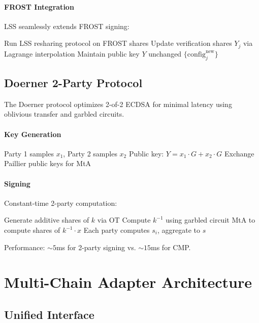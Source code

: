 \documentclass[11pt,twocolumn]{article}
\begin{document}
\paragraph{FROST Integration} LSS seamlessly extends FROST signing:
\begin{algorithmic}[1]
\State Run LSS resharing protocol on FROST shares
\State Update verification shares $Y_j$ via Lagrange interpolation
\State Maintain public key $Y$ unchanged
\State \Return $\{\text{config}_j^{\text{new}}\}$
\EndFunction
\end{algorithmic}

\subsection{Doerner 2-Party Protocol}

The Doerner protocol \cite{doerner2018} optimizes 2-of-2 ECDSA for minimal latency using oblivious transfer and garbled circuits.

\paragraph{Key Generation}
\begin{algorithmic}[1]
\State Party 1 samples $x_1$, Party 2 samples $x_2$
\State Public key: $Y = x_1 \cdot G + x_2 \cdot G$
\State Exchange Paillier public keys for MtA
\end{algorithmic}

\paragraph{Signing} Constant-time 2-party computation:
\begin{algorithmic}[1]
\State Generate additive shares of $k$ via OT
\State Compute $k^{-1}$ using garbled circuit
\State MtA to compute shares of $k^{-1} \cdot x$
\State Each party computes $s_i$, aggregate to $s$
\end{algorithmic}

Performance: $\sim 5$ms for 2-party signing vs. $\sim 15$ms for CMP.

\section{Multi-Chain Adapter Architecture}

\subsection{Unified Interface}
\end{document}
